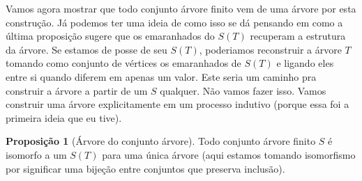 \documentclass[11pt]{article}
\theoremstyle{definition}
\theoremstyle{definition}
\theoremstyle{definition}
\newtheorem{prop}{Proposição}
\newenvironment{proposicao}{
\definecolor{shadecolor}{HTML}{FFDBDF}
\begin{shaded}
\begin{prop}
}
{
\end{prop}
\end{shaded}
}
\theoremstyle{definition}
\theoremstyle{definition}
\theoremstyle{definition}
\theoremstyle{definition}
\theoremstyle{definition}
\theoremstyle{definition}
\theoremstyle{definition}
\theoremstyle{definition}
\theoremstyle{definition}
\theoremstyle{definition}
\begin{document}
Vamos agora mostrar que todo conjunto árvore finito vem de uma árvore por esta construção. Já podemos ter uma ideia de como isso se dá pensando em como a última proposição sugere que os emaranhados do $S(T)$ recuperam a estrutura da árvore. Se estamos de posse de seu $S(T)$, poderiamos reconstruir a árvore $T$ tomando como conjunto de vértices os emaranhados de $S(T)$ e ligando eles entre si quando diferem em apenas um valor. Este seria um caminho pra construir a árvore a partir de um $S$ qualquer. Não vamos fazer isso. Vamos construir uma árvore explicitamente em um processo indutivo (porque essa foi a primeira ideia que eu tive).

\begin{proposicao}[Árvore do conjunto árvore]
 Todo conjunto árvore finito $S$ é isomorfo a um $S(T)$ para uma única árvore (aqui estamos tomando isomorfismo por significar uma bijeção entre conjuntos que preserva inclusão).
\end{proposicao}
\end{document}
